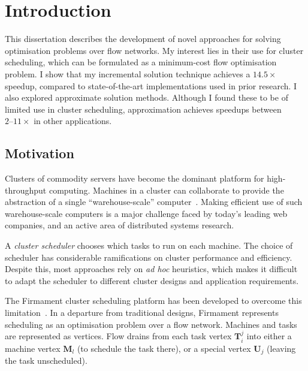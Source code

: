 \chapter{Introduction} \label{chap:intro}


This dissertation describes the development of novel approaches for solving optimisation problems over flow networks. My interest lies in their use for cluster scheduling, which can be formulated as a minimum-cost flow optimisation problem. I show that my incremental solution technique achieves a $14.5\times$ speedup, compared to state-of-the-art implementations used in prior research. I also explored approximate solution methods. Although I found these to be of limited use in cluster scheduling, approximation achieves speedups between $2\text{--}11\times$ in other applications.

\section{Motivation} \label{sec:intro-motivation}
Clusters of commodity servers have become the dominant platform for high-throughput computing. Machines in a cluster can collaborate to provide the abstraction of a single ``warehouse-scale'' computer~\cite{WarehouseScale:2009}. Making efficient use of such warehouse-scale computers is a major challenge faced by today's leading web companies, and an active area of distributed systems research.

A \emph{cluster scheduler} chooses which tasks to run on each machine. The choice of scheduler has considerable ramifications on cluster performance and efficiency. Despite this, most approaches rely on \emph{ad hoc} heuristics, which makes it difficult to adapt the scheduler to different cluster designs and application requirements.

The Firmament cluster scheduling platform has been developed to overcome this limitation\footnotemark~\cite[ch.~5]{Schwarzkopf:2015}. In a departure from traditional designs, Firmament represents scheduling as an optimisation problem over a flow network. Machines and tasks are represented as vertices. Flow drains from each task vertex $\mathbf{T}_i^j$ into either a machine vertex $\mathbf{M}_l$ (to schedule the task there), or a special vertex $\mathbf{U}_j$ (leaving the task unscheduled).

